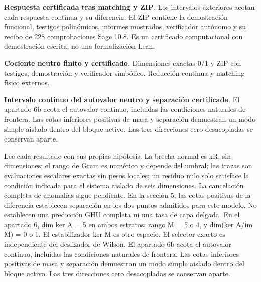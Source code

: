 \documentclass[11pt,a4paper]{article}
\begin{document}
\textbf{Respuesta certificada tras matching y ZIP}. Los intervalos exteriores acotan cada respuesta continua y su diferencia. El ZIP contiene la demostración funcional, testigos polinómicos, informes mostrados, verificador autónomo y su recibo de 228 comprobaciones Sage 10.8. Es un certificado computacional con demostración escrita, no una formalización Lean.

\textbf{Cociente neutro finito y certificado}. Dimensiones exactas 0/1 y ZIP con testigos, demostración y verificador simbólico. Reducción continua y matching físico externos.

\textbf{Intervalo continuo del autovalor neutro y separación certificada}. El apartado 6b acota el autovalor continuo, incluidas las condiciones naturales de frontera. Las cotas inferiores positivas de masa y separación demuestran un modo simple aislado dentro del bloque activo. Las tres direcciones cero desacopladas se conservan aparte.

Lee cada resultado con sus propias hipótesis. La brecha normal es kR, sin dimensiones; el rango de Gram es numérico y depende del umbral; las trazas son evaluaciones escalares exactas sin pesos locales; un residuo nulo solo satisface la condición indicada para el sistema aislado de seis dimensiones. La cancelación completa de anomalías sigue pendiente. En la sección 5, las cotas positivas de la diferencia establecen separación en los dos puntos admitidos para este modelo. No establecen una predicción GHU completa ni una tasa de capa delgada. En el apartado 6, dim ker A = 5 en ambos estratos; rango M = 5 o 4, y dim(ker A/im M) = 0 o 1. El estabilizador ker M es otro espacio. El selector exacto es independiente del deslizador de Wilson. El apartado 6b acota el autovalor continuo, incluidas las condiciones naturales de frontera. Las cotas inferiores positivas de masa y separación demuestran un modo simple aislado dentro del bloque activo. Las tres direcciones cero desacopladas se conservan aparte.
\end{document}
